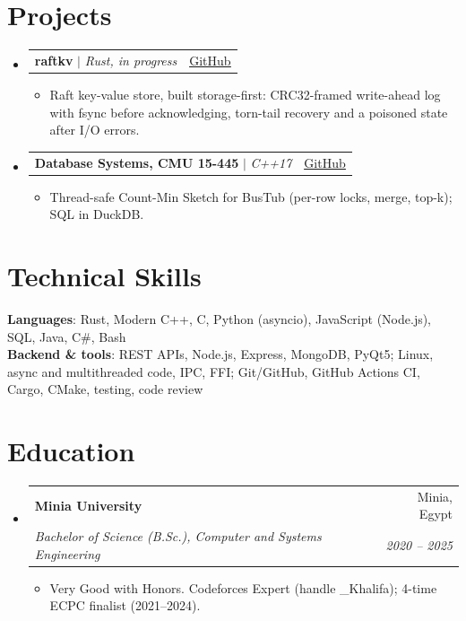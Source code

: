 \documentclass[letterpaper,11pt]{article}
\makeatletter
\newcommand{\resumeItem}[1]{
  \item\small{
    {#1 \vspace{-2pt}}
  }
}
\newcommand{\resumeSubheading}[4]{
  \vspace{-2pt}\item
    \begin{tabular*}{0.97\textwidth}[t]{l@{\extracolsep{\fill}}r}
      \textbf{#1} & #2 \\
      \textit{\small#3} & \textit{\small #4} \\
    \end{tabular*}\vspace{-7pt}
}
\newcommand{\resumeProjectHeading}[2]{
    \item
    \begin{tabular*}{0.97\textwidth}{l@{\extracolsep{\fill}}r}
      \small#1 & #2 \\
    \end{tabular*}\vspace{-7pt}
}
\newcommand{\resumeSubHeadingListStart}{\begin{itemize}[leftmargin=0.15in, label={}]}
\newcommand{\resumeSubHeadingListEnd}{\end{itemize}}
\newcommand{\resumeItemListStart}{\begin{itemize}}
\newcommand{\resumeItemListEnd}{\end{itemize}\vspace{-5pt}}
\newcommand{\cvlink}[2]{\href{#1}{\underline{#2}}}
\makeatother
\begin{document}
\section{Projects}
    \resumeSubHeadingListStart
      \resumeProjectHeading
          {\textbf{raftkv} $|$ \emph{Rust, in progress}}{\cvlink{https://github.com/Abd002/raftkv}{GitHub}}
          \resumeItemListStart
            \resumeItem{Raft key-value store, built storage-first: CRC32-framed write-ahead log with fsync before acknowledging, torn-tail recovery and a poisoned state after I/O errors.}
          \resumeItemListEnd
      \resumeProjectHeading
          {\textbf{Database Systems, CMU 15-445} $|$ \emph{C++17}}{\cvlink{https://github.com/Abd002/db-systems-journey}{GitHub}}
          \resumeItemListStart
            \resumeItem{Thread-safe Count-Min Sketch for BusTub (per-row locks, merge, top-k); SQL in DuckDB.}
          \resumeItemListEnd
    \resumeSubHeadingListEnd

%
\section{Technical Skills}
 \begin{itemize}[leftmargin=0.15in, label={}]
    \small{\item{
     \textbf{Languages}{: Rust, Modern C++, C, Python (asyncio), JavaScript (Node.js), SQL, Java, C\#, Bash} \\
     \textbf{Backend \& tools}{: REST APIs, Node.js, Express, MongoDB, PyQt5; Linux, async and multithreaded code, IPC, FFI; Git/GitHub, GitHub Actions CI, Cargo, CMake, testing, code review}
    }}
 \end{itemize}

\section{Education}
  \resumeSubHeadingListStart
    \resumeSubheading
      {Minia University}{Minia, Egypt}
      {Bachelor of Science (B.Sc.), Computer and Systems Engineering}{2020 -- 2025}
      \resumeItemListStart
        \resumeItem{Very Good with Honors. Codeforces Expert (handle \_Khalifa); 4-time ECPC finalist (2021--2024).}
      \resumeItemListEnd
  \resumeSubHeadingListEnd


\end{document}
